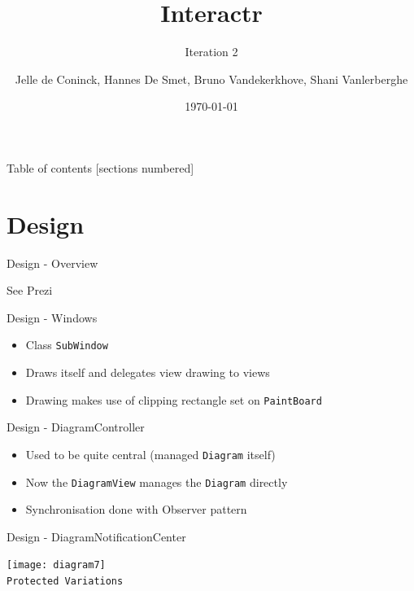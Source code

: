 \documentclass[10pt]{beamer}
\title{Interactr}
\subtitle{Iteration 2}
\date{\today}
\author{Jelle de Coninck, Hannes De Smet, Bruno Vandekerkhove, Shani Vanlerberghe}
\institute{KULeuven}
\begin{document}
\maketitle

\begin{frame}{Table of contents}
  [sections numbered]
  \tableofcontents[hideallsubsections]
\end{frame}

\section{Design}

\begin{frame}[fragile]{Design - Overview}
\begin{center}
See Prezi
\end{center}
\end{frame}

\begin{frame}[fragile]{Design - Windows}
\begin{itemize}
\item Class \texttt{SubWindow}
\item Draws itself and delegates view drawing to views
\item Drawing makes use of clipping rectangle set on \texttt{PaintBoard}
\end{itemize}
\end{frame}

\begin{frame}[fragile]{Design - DiagramController}
\begin{itemize}
\item Used to be quite central (managed \texttt{Diagram} itself)
\item Now the \texttt{DiagramView} manages the \texttt{Diagram} directly
\item Synchronisation done with Observer pattern
\end{itemize}
\end{frame}

\begin{frame}[fragile]{Design - DiagramNotificationCenter}
\begin{center}
\texttt{[image: diagram7]}
\vspace{0.5cm}\\\texttt{Protected Variations}
\end{center}
\end{frame}
\end{document}
